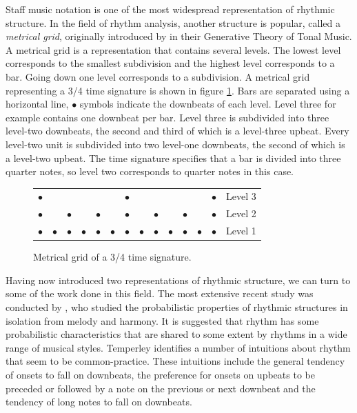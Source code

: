 Staff music notation is one of the most widespread representation of rhythmic structure. In the field of rhythm analysis, another structure is popular, called a \textit{metrical grid}, originally introduced by \citet{lerdahl1983generative} in their Generative Theory of Tonal Music. A metrical grid is a representation that contains several levels. The lowest level corresponds to the smallest subdivision and the highest level corresponds to a bar. Going down one level corresponds to a subdivision. A metrical grid representing a 3/4 time signature is shown in figure \ref{fig:grid}. Bars are separated using a horizontal line, $\bullet$ symbols indicate the downbeats of each level. Level three for example contains one downbeat per bar. Level three is subdivided into three level-two downbeats, the second and third of which is a level-three upbeat. Every level-two unit is subdivided into two level-one downbeats, the second of which is a level-two upbeat. The time signature specifies that a bar is divided into three quarter notes, so level two corresponds to quarter notes in this case.

\begin{figure}[b]
\centering
\hspace{2in}
\setlength{\extrarowheight}{-10.5pt}
\begin{tabular}{llllll|llllll|ll}
$\bullet$ &  &  &  &  &  & 		$\bullet$ &  &  &  &  &  & $\bullet$ & Level 3\\ 
$\bullet$ &  & 	$\bullet$ &  & 	$\bullet$ & & 	$\bullet$ & & $\bullet$ &  & $\bullet$ &  & $\bullet$ & Level 2\\
$\bullet$ & 		$\bullet$ & 		$\bullet$ & 		$\bullet$ & $\bullet$ & $\bullet$ & $\bullet$ & $\bullet$ & $\bullet$ & $\bullet$ & $\bullet$ & $\bullet$ & $\bullet$ & Level 1\\
\end{tabular}
\caption{Metrical grid of a 3/4 time signature.}
\label{fig:grid}
\end{figure}

Having now introduced two representations of rhythmic structure, we can turn to some of the work done in this field. The most extensive recent study was conducted by \cite{temperley2010modeling}, who studied the probabilistic properties of rhythmic structures in isolation from melody and harmony. It is suggested that rhythm has some probabilistic characteristics that are shared to some extent by rhythms in a wide range of musical styles. Temperley identifies a number of intuitions about rhythm that seem to be common-practice. These intuitions include the general tendency of onsets to fall on downbeats, the preference for onsets on upbeats to be preceded or followed by a note on the previous or next downbeat and the tendency of long notes to fall on downbeats. 

